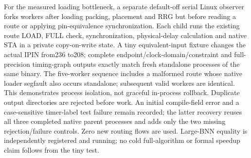 For the measured loading bottleneck, a separate default-off serial Linux observer forks workers after loading packing, placement and RRG but before reading a route or applying pin-equivalence synchronization. Each child runs the existing route LOAD, FULL check, synchronization, physical-delay calculation and native STA in a private copy-on-write state. A tiny equivalent-input fixture changes the actual IPIN from236 to208; complete endpoint/clock-domain/constraint and full-precision timing-graph outputs exactly match fresh standalone processes of the same binary. The five-worker sequence includes a malformed route whose native loader segfault also occurs standalone; subsequent valid workers are identical. This demonstrates process isolation, not graceful in-process rollback. Duplicate output directories are rejected before work. An initial compile-field error and a case-sensitive timer-label test failure remain recorded; the latter recovery reuses all three completed native parent processes and adds only the two missing rejection/failure controls. Zero new routing flows are used. Large-BNN equality is independently registered and running; no cold full-algorithm or formal speedup claim follows from the tiny test.
